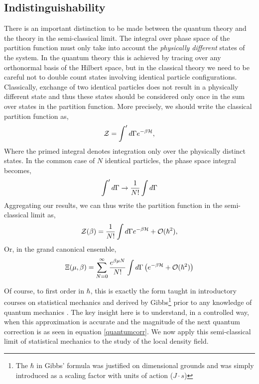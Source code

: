 \subsection{Indistinguishability} %

There is an important distinction to be made between the quantum theory and the
theory in the semi-classical limit.  The integral over phase space of the
partition function must only take into account the \textit{physically
different} states of the system.  In the quantum theory this is achieved by
tracing over any orthonormal basis of the Hilbert space, but in the classical
theory we need to be careful not to double count states involving identical
particle configurations. Classically, exchange of two identical particles does
not result in a physically different state and thus these states should be
considered only once in the sum over states in the partition function.  More
precisely, we should write the classical partition function as,
%
\begin{equation}
    \mathcal{Z} = \int^\prime d\Gamma e^{-\beta \mathcal{H}}, 
\end{equation}
%
Where the primed integral denotes integration only over the physically distinct
states. In the common case of $N$ identical particles, the phase space integral
becomes, 
%
\begin{equation}
    \int^\prime d\Gamma \rightarrow \frac{1}{N!}\int d\Gamma
\end{equation}
%
Aggregating our results, we can thus write the partition function in the
semi-classical limit as,
%
\begin{equation}
    \mathcal{Z}(\beta) = \frac{1}{N!}\int d\Gamma e^{-\beta \mathcal{H}} + \mathcal{O}(\hbar ^ 2),
\end{equation}
%
Or, in the grand canonical ensemble,
%
\begin{equation} 
    \Xi(\mu, \beta) = \sum_{N = 0}^\infty \frac{e^{\beta\mu N}}{N!}
        \int d\Gamma \left( e^{-\beta \mathcal{H}} + \mathcal{O}(\hbar^2)\right)
\end{equation}

Of course, to first order in $\hbar$, this is exactly the form taught in
introductory courses on statistical mechanics and derived by Gibbs\footnote{The
$\hbar$ in Gibbs' formula was justified on dimensional grounds and was simply 
introduced as a scaling factor with units of action ($J\cdot s$)} prior to any knowledge of
quantum mechanics \cite{Gibbs}. The key insight here is to understand, in a
controlled way, when this approximation is accurate and the magnitude of the next
quantum correction is as seen in equation \ref{quantumcorr}. We now apply this
semi-classical limit of statistical mechanics to the study of the local density
field.

